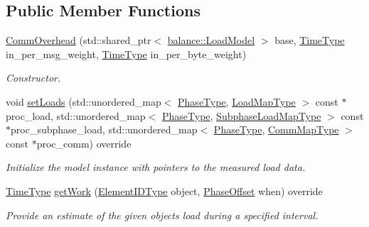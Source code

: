 \subsection*{Public Member Functions}
\begin{DoxyCompactItemize}
\item 
\hyperlink{structvt_1_1vrt_1_1collection_1_1balance_1_1_comm_overhead_af918fee4ae0360d93c19442945e9c3d4}{Comm\+Overhead} (std\+::shared\+\_\+ptr$<$ \hyperlink{classvt_1_1vrt_1_1collection_1_1balance_1_1_load_model}{balance\+::\+Load\+Model} $>$ base, \hyperlink{namespacevt_a876a9d0cd5a952859c72de8a46881442}{Time\+Type} in\+\_\+per\+\_\+msg\+\_\+weight, \hyperlink{namespacevt_a876a9d0cd5a952859c72de8a46881442}{Time\+Type} in\+\_\+per\+\_\+byte\+\_\+weight)
\begin{DoxyCompactList}\small\item\em Constructor. \end{DoxyCompactList}\item 
void \hyperlink{structvt_1_1vrt_1_1collection_1_1balance_1_1_comm_overhead_a4c74d8adf7fa0fbc5e4767397b479305}{set\+Loads} (std\+::unordered\+\_\+map$<$ \hyperlink{namespacevt_a46ce6733d5cdbd735d561b7b4029f6d7}{Phase\+Type}, \hyperlink{namespacevt_1_1vrt_1_1collection_1_1balance_a45306ee4bf38fe3fb586d1ee2fa3d147}{Load\+Map\+Type} $>$ const $\ast$proc\+\_\+load, std\+::unordered\+\_\+map$<$ \hyperlink{namespacevt_a46ce6733d5cdbd735d561b7b4029f6d7}{Phase\+Type}, \hyperlink{namespacevt_1_1vrt_1_1collection_1_1balance_a3d91523158c1025b7b665240072f3b7e}{Subphase\+Load\+Map\+Type} $>$ const $\ast$proc\+\_\+subphase\+\_\+load, std\+::unordered\+\_\+map$<$ \hyperlink{namespacevt_a46ce6733d5cdbd735d561b7b4029f6d7}{Phase\+Type}, \hyperlink{namespacevt_1_1vrt_1_1collection_1_1balance_a10860c956804d644db54a16012352728}{Comm\+Map\+Type} $>$ const $\ast$proc\+\_\+comm) override
\begin{DoxyCompactList}\small\item\em Initialize the model instance with pointers to the measured load data. \end{DoxyCompactList}\item 
\hyperlink{namespacevt_a876a9d0cd5a952859c72de8a46881442}{Time\+Type} \hyperlink{structvt_1_1vrt_1_1collection_1_1balance_1_1_comm_overhead_ab44aa1c71e7925c248aefe611f76f5c8}{get\+Work} (\hyperlink{namespacevt_1_1vrt_1_1collection_1_1balance_a14c8d2c972f2913aa3f1636e5be0a120}{Element\+I\+D\+Type} object, \hyperlink{structvt_1_1vrt_1_1collection_1_1balance_1_1_phase_offset}{Phase\+Offset} when) override
\begin{DoxyCompactList}\small\item\em Provide an estimate of the given object\textquotesingle{}s load during a specified interval. \end{DoxyCompactList}\end{DoxyCompactItemize}
